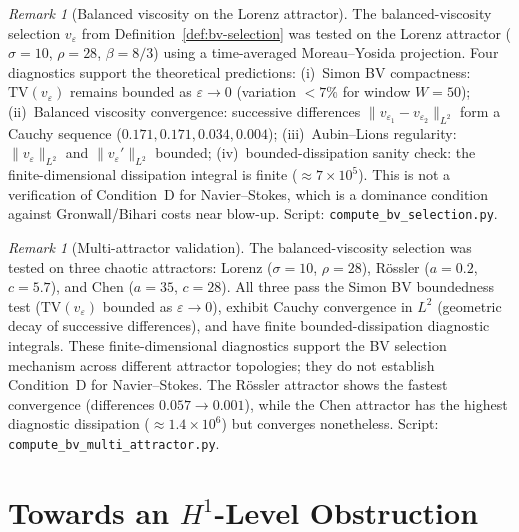 \documentclass[12pt,a4paper]{article}
\theoremstyle{definition}
\theoremstyle{plain}
\theoremstyle{remark}
\newtheorem{remark}[definition]{Remark}
\begin{document}
\begin{remark}[Balanced viscosity on the Lorenz attractor]
\label{rem:bv-lorenz}
The balanced-viscosity selection $v_\varepsilon$ from Definition~\ref{def:bv-selection} was tested on the Lorenz attractor ($\sigma=10$, $\rho=28$, $\beta=8/3$) using a time-averaged Moreau--Yosida projection. Four diagnostics support the theoretical predictions: (i)~Simon BV compactness: $\mathrm{TV}(v_\varepsilon)$ remains bounded as $\varepsilon \to 0$ (variation $< 7\%$ for window $W=50$); (ii)~Balanced viscosity convergence: successive differences $\|v_{\varepsilon_1} - v_{\varepsilon_2}\|_{L^2}$ form a Cauchy sequence ($0.171, 0.171, 0.034, 0.004$); (iii)~Aubin--Lions regularity: $\|v_\varepsilon\|_{L^2}$ and $\|v_\varepsilon'\|_{L^2}$ bounded; (iv)~bounded-dissipation sanity check: the finite-dimensional dissipation integral is finite ($\approx 7 \times 10^5$). This is not a verification of Condition~D for Navier--Stokes, which is a dominance condition against Gronwall/Bihari costs near blow-up. Script: \texttt{compute\_bv\_selection.py}.
\end{remark}

\begin{remark}[Multi-attractor validation]
\label{rem:multi-attractor}
The balanced-viscosity selection was tested on three chaotic attractors: Lorenz ($\sigma=10$, $\rho=28$), R\"ossler ($a=0.2$, $c=5.7$), and Chen ($a=35$, $c=28$). All three pass the Simon BV boundedness test ($\mathrm{TV}(v_\varepsilon)$ bounded as $\varepsilon \to 0$), exhibit Cauchy convergence in $L^2$ (geometric decay of successive differences), and have finite bounded-dissipation diagnostic integrals. These finite-dimensional diagnostics support the BV selection mechanism across different attractor topologies; they do not establish Condition~D for Navier--Stokes. The R\"ossler attractor shows the fastest convergence (differences $0.057 \to 0.001$), while the Chen attractor has the highest diagnostic dissipation ($\approx 1.4 \times 10^6$) but converges nonetheless. Script: \texttt{compute\_bv\_multi\_attractor.py}.
\end{remark}

\section{Towards an \texorpdfstring{$H^1$}{H1}-Level Obstruction}\label{sec:H1-lift}
\end{document}
